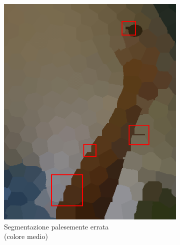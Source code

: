 \documentclass[12pt,a4paper,oneside]{article}
\begin{document}
\begin{figure}[!htb]
\begin{subfigure}[t]{.325\textwidth}
		\includegraphics[width=\textwidth]{resources/images/drifting1100b.png}
		\captionsetup{justification=centering}
		\caption{Segmentazione palesemente errata\\(colore medio)}\label{es_drifting_1100b}
	\end{subfigure}%
	\hfill
	\begin{subfigure}[t]{.325\textwidth}

\end{subfigure}
\end{figure}
\end{document}
